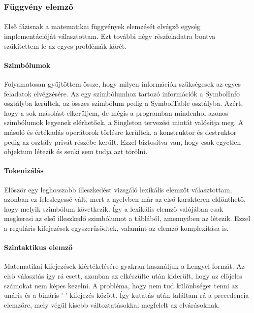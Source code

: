 \documentclass[12pt]{report}
\begin{document}
\subsubsection{Függvény elemző}
\paragraph{}
Első fázisnak a matematikai függvények elemzését elvégző egység implementációját választottam. Ezt további négy részfeladatra bontva szűkítettem le az egyes problémák körét.

\paragraph{Szimbólumok}
Folyamatosan gyűjtöttem össze, hogy milyen információk szükségesek az egyes feladatok elvégzésére. Az egy szimbólumhoz tartozó információk a SymbolInfo osztályba kerültek, az összes szimbólum pedig a SymbolTable osztályba. Azért, hogy a sok másolást elkerüljem, de mégis a programban mindenhol azonos szimbólumok legyenek elérhetőek, a Singleton tervezési mintát valósítja meg. A másoló és értékadás operátorok törlésre kerültek, a konstruktor és destruktor pedig az osztály privát részébe került. Ezzel biztosítva van, hogy csak egyetlen objektum létezik és senki sem tudja azt törölni.

\paragraph{Tokenizálás}
Először egy leghosszabb illeszkedést vizsgáló lexikális elemzőt választottam, azonban ez feleslegessé vált, mert a nyelvben már az első karakteren eldönthető, hogy melyik szimbólum következik. Így a lexikális elemző valójában csak megkeresi az első illeszkedő szimbólumot a táblából, amennyiben az létezik. Ezzel a reguláris kifejezések egyszerűsödtek, valamint az elemző komplexitása is.

\paragraph{Szintaktikus elemző}
Matematikai kifejezések kiértékelésére gyakran használjuk a Lengyel-formát. Az első választás így rá esett, azonban az elkészülte után kiderült, hogy az előjeles számokat nem képes kezelni. A probléma, hogy nem tud különbséget tenni az unáris és a bináris '-' kifejezés között. Így kutatás után találtam rá a precedencia elemzőre, mely végül kisebb változtatásokkal megfelelt az elvárásoknak. 
\end{document}
